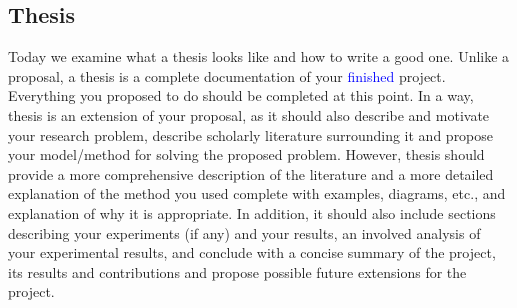 
\usepackage[compact]{titlesec}




\subsection*{Thesis}
Today we examine what a thesis looks like and how to write a good one. Unlike a proposal, a thesis is a complete documentation of your \textcolor{blue}{finished} project. Everything you proposed to do should be completed at this point. In a way, thesis is an extension of your proposal, as it should also describe and motivate your research problem, describe scholarly literature surrounding it and propose your model/method for solving the proposed problem. However, thesis should provide a more comprehensive description of the literature and a more detailed explanation of the method you used complete with examples, diagrams, etc., and explanation of why it is appropriate. In addition, it should also include sections describing your experiments (if any) and your results, an involved  analysis of your experimental results, and conclude with a concise summary of the project, its results and contributions and propose possible future extensions for the project.  

